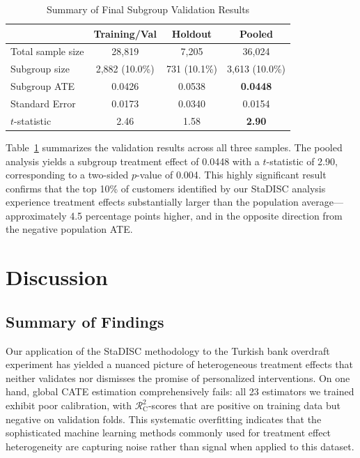 \documentclass[11pt,a4paper]{article}
\newcommand{\rsquare}{\ensuremath{\mathcal{R}^2_{\mathrm{C}}}}
\begin{document}
\begin{table}[H]
	\centering
	\caption{Summary of Final Subgroup Validation Results}
	\label{tab:final_results}
	\begin{tabular}{lccc}
		\toprule
		& \textbf{Training/Val} & \textbf{Holdout} & \textbf{Pooled} \\
		\midrule
		Total sample size & 28,819 & 7,205 & 36,024 \\
		Subgroup size & 2,882 (10.0\%) & 731 (10.1\%) & 3,613 (10.0\%) \\
		Subgroup ATE & 0.0426 & 0.0538 & \textbf{0.0448} \\
		Standard Error & 0.0173 & 0.0340 & 0.0154 \\
		$t$-statistic & 2.46 & 1.58 & \textbf{2.90} \\
		\bottomrule
	\end{tabular}
\end{table}

Table~\ref{tab:final_results} summarizes the validation results across all three samples. The pooled analysis yields a subgroup treatment effect of 0.0448 with a $t$-statistic of 2.90, corresponding to a two-sided $p$-value of 0.004. This highly significant result confirms that the top 10\% of customers identified by our StaDISC analysis experience treatment effects substantially larger than the population average---approximately 4.5 percentage points higher, and in the opposite direction from the negative population ATE.

\section{Discussion}

\subsection{Summary of Findings}
Our application of the StaDISC methodology to the Turkish bank overdraft experiment has yielded a nuanced picture of heterogeneous treatment effects that neither validates nor dismisses the promise of personalized interventions. On one hand, global CATE estimation comprehensively fails: all 23 estimators we trained exhibit poor calibration, with $\rsquare$-scores that are positive on training data but negative on validation folds. This systematic overfitting indicates that the sophisticated machine learning methods commonly used for treatment effect heterogeneity are capturing noise rather than signal when applied to this dataset.
\end{document}

